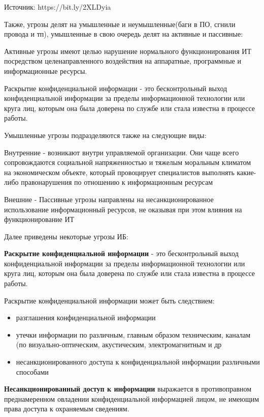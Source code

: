 Источник: https://bit.ly/2XLDyia

Также, угрозы делят на умышленные и неумышленные(баги в ПО, сгнили провода и тп), умышленные в свою очередь делят на активные и пассивные:

Активные угрозы имеют целью нарушение нормального функционирования ИТ посредством целенаправленного воздействия на аппаратные, программные и информационные ресурсы.

Раскрытие конфиденциальной информации - это бесконтрольный выход конфиденциальной информации за пределы информационной технологии или круга лиц, которым она была доверена по службе или стала известна в процессе работы.

Умышленные угрозы подразделяются также на следующие виды:

Внутренние - возникают внутри управляемой организации. Они чаще всего сопровождаются социальной напряженностью и тяжелым моральным климатом на экономическом объекте, который провоцирует специалистов выполнять какие-либо правонарушения по отношению к информационным ресурсам

Внешние - Пассивные угрозы направлены на несанкционированное использование информационный ресурсов, не оказывая при этом влияния на функционирование ИТ

Далее приведены некоторые угрозы ИБ:

\textbf{Раскрытие конфиденциальной информации} - это бесконтрольный выход конфиденциальной информации за пределы информационной технологии или круга лиц, которым она была доверена по службе или стала известна в процессе работы.

Раскрытие конфиденциальной информации может быть следствием:
\begin{itemize}
    \item разглашения конфиденциальной информации
    \item утечки информации по различным, главным образом техническим, каналам (по визуально-оптическим, акустическим, электромагнитным и др
    \item несанкционированного доступа к конфиденциальной информации различными способами
\end{itemize}

\textbf{Несанкционированный доступ к информации} выражается в противоправном преднамеренном овладении конфиденциальной информацией лицом, не имеющим права доступа к охраняемым сведениям.

